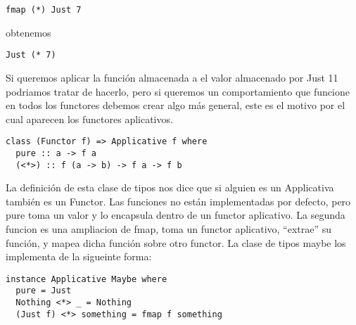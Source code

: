 \begin{lstlisting}
fmap (*) Just 7
\end{lstlisting}

obtenemos

\begin{lstlisting}
Just (* 7)
\end{lstlisting}

Si queremos aplicar la función almacenada a el valor almacenado por Just 11 podriamos tratar de hacerlo, pero si queremos un comportamiento que funcione en todos los functores debemos crear algo más general, este es el motivo por el cual aparecen los functores aplicativos.

\begin{lstlisting}
class (Functor f) => Applicative f where
  pure :: a -> f a
  (<*>) :: f (a -> b) -> f a -> f b
\end{lstlisting}

La definición de esta clase de tipos nos dice que si alguien es un Applicativa también es un Functor.
Las funciones no están implementadas por defecto, pero pure toma un valor y lo encapsula dentro de un functor aplicativo.
La segunda funcion es una ampliacion de fmap, toma un functor aplicativo, “extrae” su función, y mapea dicha función sobre otro functor. La clase de tipos maybe los implementa de la sigueinte forma:

\begin{lstlisting}
instance Applicative Maybe where
  pure = Just
  Nothing <*> _ = Nothing
  (Just f) <*> something = fmap f something
\end{lstlisting}


